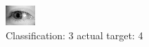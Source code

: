 \begin{figure}[h!]
\begin{center}
\includegraphics[width=0.60\columnwidth]{figures/ID3242_class_3_target_4.png}
\end{center}
\caption{ Classification: 3 actual target: 4}
\label{fig:ID3242_class_3_target_4}
\end{figure}
